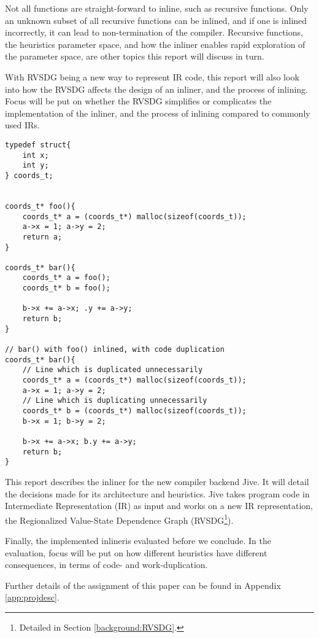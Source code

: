 Not all functions are straight-forward to inline, such as recursive functions.
Only an unknown subset of all recursive functions can be inlined, and if one is
inlined incorrectly, it can lead to non-termination of the compiler. Recursive
functions, the heuristics parameter space, and how the inliner enables rapid
exploration of the parameter space, are other topics this report will discuss in
turn.

With RVSDG being a new way to represent IR code, this report will also look into
how the RVSDG affects the design of an inliner, and the process of inlining.
Focus will be put on whether the RVSDG simplifies or complicates the
implementation of the inliner, and the process of inlining compared to commonly
used IRs.

\clearpage
\begin{lstlisting}[label={lst:code-dup}, style=customcpp,
caption={Code duplication in \textit{bar()}, when inlining \textit{foo()} into
\textit{bar()}.}]
typedef struct{
	int x;
	int y;
} coords_t;


coords_t* foo(){
	coords_t* a = (coords_t*) malloc(sizeof(coords_t));
	a->x = 1; a->y = 2;
	return a;
}

coords_t* bar(){
	coords_t* a = foo();
	coords_t* b = foo();

	b->x += a->x; .y += a->y;
	return b;
}

// bar() with foo() inlined, with code duplication
coords_t* bar(){
	// Line which is duplicated unnecessarily
	coords_t* a = (coords_t*) malloc(sizeof(coords_t));
	a->x = 1; a->y = 2;
	// Line which is duplicating unnecessarily
	coords_t* b = (coords_t*) malloc(sizeof(coords_t));
	b->x = 1; b->y = 2;

	b->x += a->x; b.y += a->y;
	return b;
}
\end{lstlisting}


This report describes the inliner for the new compiler backend Jive. It will
detail the decisions made for its architecture and heuristics. Jive takes
program code in Intermediate Representation (IR) as input and works on a new IR
representation, the Regionalized Value-State Dependence Graph
(RVSDG\footnote{Detailed in Section \ref{background:RVSDG}.}).

Finally, the implemented inlineris evaluated before we conclude. In the
evaluation, focus will be put on how different heuristics have different
consequences, in terms of code- and work-duplication.

Further details of the assignment of this paper can be found in Appendix
\ref{app:projdesc}.
